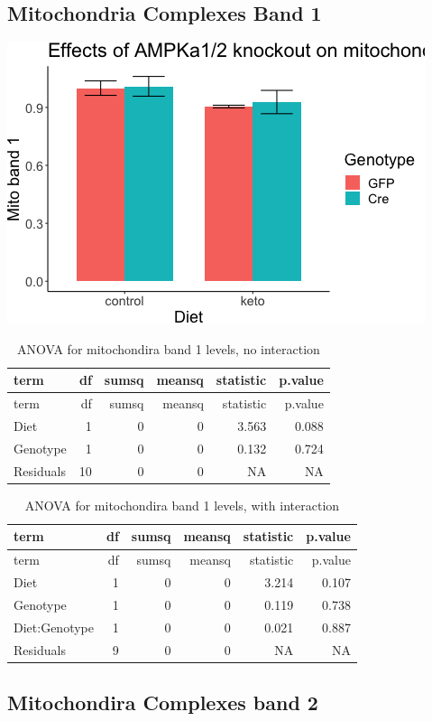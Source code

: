 \documentclass[]{article}
\begin{document}
\hypertarget{mitochondria-complexes-band-1}{%
\subsection{Mitochondria Complexes Band
1}\label{mitochondria-complexes-band-1}}

\includegraphics{figures/mitoband1-barplot-1.png}

\begin{longtable}[]{@{}lrrrrr@{}}
\caption{ANOVA for mitochondira band 1 levels, no
interaction}\tabularnewline
\toprule
term & df & sumsq & meansq & statistic & p.value\tabularnewline
\midrule
\endfirsthead
\toprule
term & df & sumsq & meansq & statistic & p.value\tabularnewline
\midrule
\endhead
Diet & 1 & 0 & 0 & 3.563 & 0.088\tabularnewline
Genotype & 1 & 0 & 0 & 0.132 & 0.724\tabularnewline
Residuals & 10 & 0 & 0 & NA & NA\tabularnewline
\bottomrule
\end{longtable}

\begin{longtable}[]{@{}lrrrrr@{}}
\caption{ANOVA for mitochondira band 1 levels, with
interaction}\tabularnewline
\toprule
term & df & sumsq & meansq & statistic & p.value\tabularnewline
\midrule
\endfirsthead
\toprule
term & df & sumsq & meansq & statistic & p.value\tabularnewline
\midrule
\endhead
Diet & 1 & 0 & 0 & 3.214 & 0.107\tabularnewline
Genotype & 1 & 0 & 0 & 0.119 & 0.738\tabularnewline
Diet:Genotype & 1 & 0 & 0 & 0.021 & 0.887\tabularnewline
Residuals & 9 & 0 & 0 & NA & NA\tabularnewline
\bottomrule
\end{longtable}

\hypertarget{mitochondira-complexes-band-2}{%
\subsection{Mitochondira Complexes band
2}\label{mitochondira-complexes-band-2}}
\end{document}
